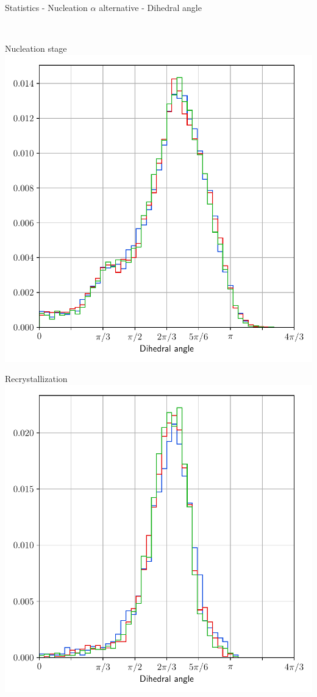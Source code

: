 \documentclass[usenames,dvipsnames]{beamer}
\begin{document}
\begin{frame}{Statistics - Nucleation $\alpha$ alternative - Dihedral angle}
\begin{minipage}{0.5\textwidth}
    \end{minipage}\\
    \vfill
    \begin{minipage}{0.5\textwidth}
    \centering
    \scriptsize
    Nucleation stage
    \includegraphics[trim={0 2.6em 0 1.1em},clip=true,scale=0.34]{figures/stored_energy/SE/dihedral/000110_nuclalternative_set.pdf}
    \end{minipage}%
    \begin{minipage}{0.5\textwidth}
    \centering
    \scriptsize
    Recrystallization
    \includegraphics[trim={0 2.6em 0 1.1em},clip=true,scale=0.34]{figures/stored_energy/SE/dihedral/000240_nuclalternative_set.pdf}
    \end{minipage}
\end{frame}
\end{document}
